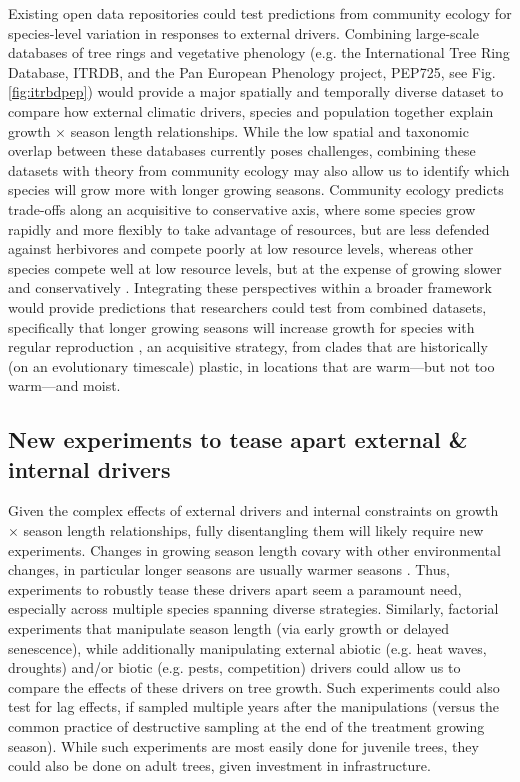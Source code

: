 \documentclass[11pt]{article}
\begin{document}
Existing open data repositories could test predictions from community ecology for species-level variation in responses to external drivers. Combining large-scale databases of tree rings and vegetative phenology (e.g. the International Tree Ring Database, ITRDB, and the Pan European Phenology project, PEP725, see Fig. \ref{fig:itrbdpep}) would provide a major spatially and temporally diverse dataset to compare how external climatic drivers, species and population together explain growth $\times$ season length relationships. While the low spatial and taxonomic overlap between these databases currently poses challenges, combining these datasets with theory from community ecology may also allow us to identify which species will grow more with longer growing seasons. Community ecology predicts trade-offs along an acquisitive to conservative axis, where some species grow rapidly and more flexibly to take advantage of resources, but are less defended against herbivores and compete poorly at low resource levels, whereas other species compete well at low resource levels, but at the expense of growing slower and conservatively \citep[][]{Grime:1977sw}. Integrating these perspectives within a broader framework would provide predictions that researchers could test from combined datasets, specifically that longer growing seasons will increase growth for species with regular reproduction \citep[no masting, see also new masting database in][]{hacket2022mastree+}, an acquisitive strategy, from clades that are historically (on an evolutionary timescale) plastic, in locations that are warm---but not too warm---and moist. 


\subsection*{New experiments to tease apart external \& internal drivers}

Given the complex effects of external drivers and internal constraints on growth $\times$ season length relationships, fully disentangling them will likely require new experiments. Changes in growing season length covary with other environmental changes, in particular longer seasons are usually warmer seasons \citep{ipcc2021}. Thus, experiments to robustly tease these drivers apart seem a paramount need, especially across multiple species spanning diverse strategies. Similarly, factorial experiments that manipulate season length (via early growth or delayed senescence), while additionally manipulating external abiotic (e.g. heat waves, droughts) and/or biotic (e.g. pests, competition) drivers could allow us to compare the effects of these drivers on tree growth. Such experiments could also test for lag effects, if sampled multiple years after the manipulations (versus the common practice of destructive sampling at the end of the treatment growing season). While such experiments are most easily done for juvenile trees, they could also be done on adult trees, given investment in infrastructure. %
\end{document}
